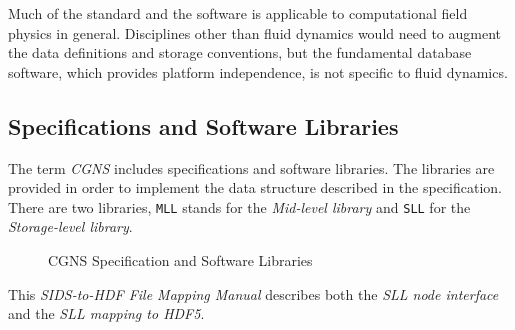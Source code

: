 Much of the standard and the software is applicable to computational
field physics in general. Disciplines other than fluid dynamics would
need to augment the data definitions and storage conventions, but the
fundamental database software, which provides platform independence, is
not specific to fluid dynamics.

\subsection{Specifications and Software Libraries}

The term \emph{CGNS} includes specifications and software libraries.
The libraries are provided in order to implement the data structure
described in the specification. There are two libraries, \texttt{MLL}
stands for the \emph{Mid-level library} and \texttt{SLL} for the
\emph{Storage-level library}. 

\setlength{\unitlength}{1em}
\begin{figure}[!htp]
\centering

\caption{CGNS Specification and Software Libraries}
\label{f:Layers}
\end{figure}

This \textit{SIDS-to-HDF File Mapping Manual} describes both the
\emph{SLL node interface} and the \emph{SLL mapping to HDF5}.
